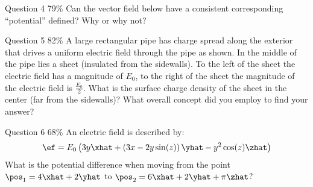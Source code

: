 \documentclass[pdf,aspectratio=169]{beamer}
\begin{document}
\begin{frame}{Question 4 \hspace{10cm} 79\%}
	Can the vector field below have a consistent corresponding ``potential'' defined? Why or why not?
	\begin{center}
	\end{center}
\end{frame}

\begin{frame}{Question 5 \hspace{10cm}82\%}
	A large rectangular pipe has charge spread along the exterior that drives a uniform electric field through the pipe as shown. In the middle of the pipe lies a sheet (insulated from the sidewalls). To the left of the sheet the electric field has a magnitude of $E_0$, to the right of the sheet the magnitude of the electric field is $\tfrac{E_0}{2}$. What is the surface charge density of the sheet in the center (far from the sidewalls)? What overall concept did you employ to find your answer?
	\begin{center}
	\end{center}
\end{frame}

\begin{frame}{Question 6 \hspace{10cm} 68\%}
	An electric field is described by:
	\[\ef = E_0\left(3y\xhat + \left(3x - 2y\sin(z)\right)\yhat - y^2\cos(z)\zhat\right)\]
	What is the potential difference when moving from the point $\pos_1 = 4\xhat + 2\yhat$ to $\pos_2= 6\xhat + 2\yhat + \pi\zhat$?
\end{frame}
\end{document}

